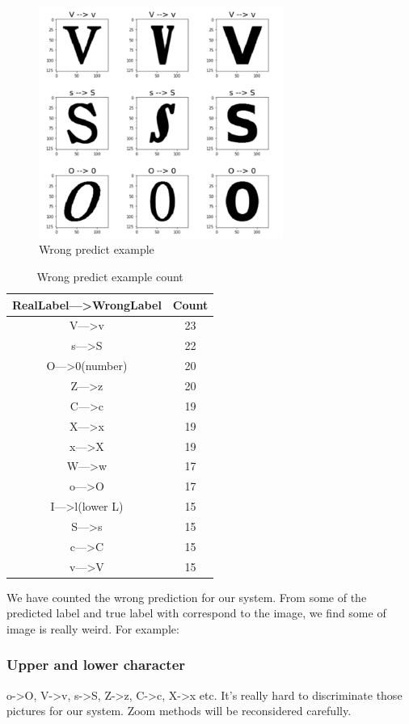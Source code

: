 \documentclass[twoside,twocolumn,10.8pt]{article}
\begin{document}
\begin{figure}[h]
\includegraphics[width=8cm]{wront_pic_ana.png}
\centering
\caption{Wrong predict example}\label{fig3}
\end{figure}

\begin{table}[h]
\caption{Wrong predict example count}
\centering
\begin{tabular}{c|c}
\hline
RealLabel—>WrongLabel & Count\\
\hline
V—>v & 23 \\
s—>S & 22 \\
O—>0(number) & 20 \\
Z—>z & 20 \\
C—>c & 19 \\
X—>x & 19 \\
x—>X & 19 \\
W—>w & 17 \\
o—>O & 17 \\
I—>l(lower L) & 15 \\
S—>s & 15 \\
c—>C & 15 \\
v—>V & 15 \\
\hline
\end{tabular}
\end{table}

\noindent We have counted the wrong prediction for our system. From some of the predicted label and true label with correspond to the image, we find some of image is really weird. For example:

\subsubsection{Upper and lower character}

o->O, V->v, s->S, Z->z, C->c, X->x etc. It's really hard to discriminate those pictures for our system. Zoom methods will be reconsidered carefully. 
\end{document}
